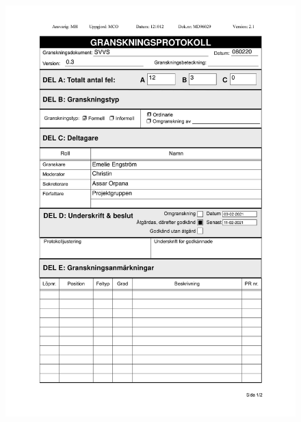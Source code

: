 \documentclass{article}
\begin{document}
 
   \begin{figure}
     \centering
     \includegraphics[width=13cm]{images/SVVS - Granskningsprotokoll-1}
     \renewcommand\figurename{Figure}
     \label{fig:my_label}
 \end{figure}
 
\end{document}
